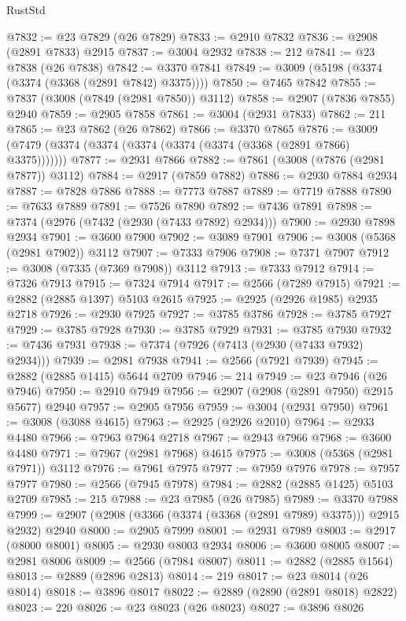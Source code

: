 \begin{lexlean}{RustStd}
\begin{coremodule}
@7832 := @23 @7829 (@26 @7829)
@7833 := @2910 @7832
@7836 := @2908 (@2891 @7833) @2915
@7837 := @3004 @2932
@7838 := 212
@7841 := @23 @7838 (@26 @7838)
@7842 := @3370 @7841
@7849 := @3009 (@5198 (@3374 (@3374 (@3368 (@2891 @7842) @3375))))
@7850 := @7465 @7842
@7855 := @7837 (@3008 (@7849 (@2981 @7850)) @3112)
@7858 := @2907 (@7836 @7855) @2940
@7859 := @2905 @7858
@7861 := @3004 (@2931 @7833)
@7862 := 211
@7865 := @23 @7862 (@26 @7862)
@7866 := @3370 @7865
@7876 := @3009 (@7479 (@3374 (@3374 (@3374 (@3374 (@3374 (@3368 (@2891 @7866) @3375)))))))
@7877 := @2931 @7866
@7882 := @7861 (@3008 (@7876 (@2981 @7877)) @3112)
@7884 := @2917 (@7859 @7882)
@7886 := @2930 @7884 @2934
@7887 := @7828 @7886
@7888 := @7773 @7887
@7889 := @7719 @7888
@7890 := @7633 @7889
@7891 := @7526 @7890
@7892 := @7436 @7891
@7898 := @7374 (@2976 (@7432 (@2930 (@7433 @7892) @2934)))
@7900 := @2930 @7898 @2934
@7901 := @3600 @7900
@7902 := @3089 @7901
@7906 := @3008 (@5368 (@2981 @7902)) @3112
@7907 := @7333 @7906
@7908 := @7371 @7907
@7912 := @3008 (@7335 (@7369 @7908)) @3112
@7913 := @7333 @7912
@7914 := @7326 @7913
@7915 := @7324 @7914
@7917 := @2566 (@7289 @7915)
@7921 := @2882 (@2885 @1397) @5103 @2615
@7925 := @2925 (@2926 @1985) @2935 @2718
@7926 := @2930 @7925
@7927 := @3785 @3786
@7928 := @3785 @7927
@7929 := @3785 @7928
@7930 := @3785 @7929
@7931 := @3785 @7930
@7932 := @7436 @7931
@7938 := @7374 (@7926 (@7413 (@2930 (@7433 @7932) @2934)))
@7939 := @2981 @7938
@7941 := @2566 (@7921 @7939)
@7945 := @2882 (@2885 @1415) @5644 @2709
@7946 := 214
@7949 := @23 @7946 (@26 @7946)
@7950 := @2910 @7949
@7956 := @2907 (@2908 (@2891 @7950) @2915 @5677) @2940
@7957 := @2905 @7956
@7959 := @3004 (@2931 @7950)
@7961 := @3008 (@3088 @4615)
@7963 := @2925 (@2926 @2010)
@7964 := @2933 @4480
@7966 := @7963 @7964 @2718
@7967 := @2943 @7966
@7968 := @3600 @4480
@7971 := @7967 (@2981 @7968) @4615
@7975 := @3008 (@5368 (@2981 @7971)) @3112
@7976 := @7961 @7975
@7977 := @7959 @7976
@7978 := @7957 @7977
@7980 := @2566 (@7945 @7978)
@7984 := @2882 (@2885 @1425) @5103 @2709
@7985 := 215
@7988 := @23 @7985 (@26 @7985)
@7989 := @3370 @7988
@7999 := @2907 (@2908 (@3366 (@3374 (@3368 (@2891 @7989) @3375))) @2915 @2932) @2940
@8000 := @2905 @7999
@8001 := @2931 @7989
@8003 := @2917 (@8000 @8001)
@8005 := @2930 @8003 @2934
@8006 := @3600 @8005
@8007 := @2981 @8006
@8009 := @2566 (@7984 @8007)
@8011 := @2882 (@2885 @1564)
@8013 := @2889 (@2896 @2813)
@8014 := 219
@8017 := @23 @8014 (@26 @8014)
@8018 := @3896 @8017
@8022 := @2889 (@2890 (@2891 @8018) @2822)
@8023 := 220
@8026 := @23 @8023 (@26 @8023)
@8027 := @3896 @8026

\end{coremodule}
\end{lexlean}
